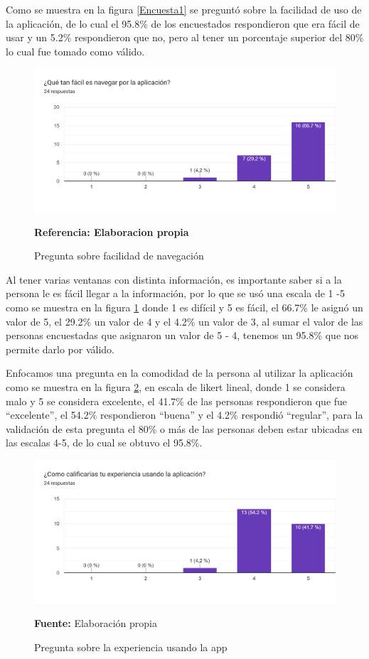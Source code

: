 \documentclass[12pt,twocolumn,a4paper]{article}
\begin{document}
Como se muestra en la figura \ref{Encuesta1} se preguntó sobre la facilidad de uso de la aplicación, de lo cual el 95.8\% de los encuestados respondieron que era fácil de usar y un 5.2\% respondieron que no, pero al tener un porcentaje superior del 80\% lo cual fue tomado como válido.

\begin{figure}
	\centering
	\includegraphics[scale=0.2]{Encuesta2.png}
	\caption{Pregunta sobre facilidad de navegación} \textbf{Referencia: Elaboracion propia} 
	\label{Encuesta2}
\end{figure}

Al tener varias ventanas con distinta información, es importante saber si a la persona le es fácil llegar a la información, por lo que se usó una escala de 1 -5 como se muestra en la figura \ref{Encuesta2}  donde 1 es difícil y 5 es fácil, el 66.7\% le asignó un valor de 5, el 29.2\% un valor de 4 y el 4.2\% un valor de 3, al sumar el valor de las personas encuestadas que asignaron un valor de 5 - 4, tenemos un 95.8\% que nos permite darlo por válido. 


Enfocamos una pregunta en la comodidad de la persona al utilizar la aplicación como se muestra en la figura \ref{Encuesta3},  en escala de likert lineal, donde 1 se considera malo y 5 se considera excelente, el 41.7\% de las personas respondieron que fue “excelente”, el 54.2\% respondieron “buena” y el 4.2\% respondió “regular”,  para la validación de esta pregunta el 80\% o más de las personas deben estar ubicadas en las escalas 4-5, de lo cual se obtuvo el 95.8\%.

\begin{figure}
	\centering
	\includegraphics[scale=0.2]{Encuesta3.png}
	\caption{Pregunta sobre la experiencia usando la app} \textbf{Fuente:} Elaboración propia 
	\label{Encuesta3}
\end{figure}
\end{document}
